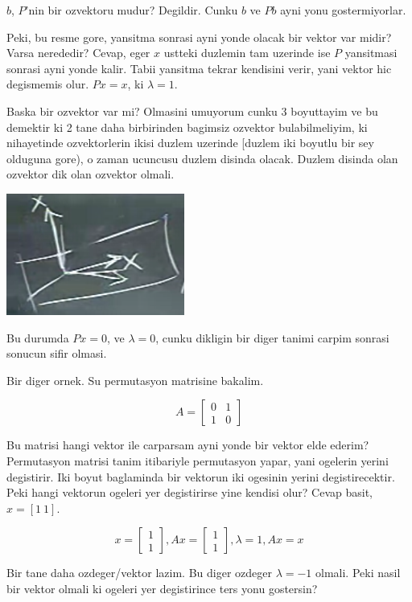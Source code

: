 \documentclass[12pt,fleqn]{article}\usepackage{../common}
\begin{document}
$b$, $P$'nin bir ozvektoru mudur? Degildir. Cunku $b$ ve $Pb$ ayni yonu
gostermiyorlar. 

Peki, bu resme gore, yansitma sonrasi ayni yonde olacak bir vektor var
midir? Varsa nerededir? Cevap, eger $x$ ustteki duzlemin tam uzerinde ise
$P$ yansitmasi sonrasi ayni yonde kalir. Tabii yansitma tekrar kendisini
verir, yani vektor hic degismemis olur. $Px = x$, ki $\lambda = 1$.

Baska bir ozvektor var mi? Olmasini umuyorum cunku 3 boyuttayim ve bu
demektir ki 2 tane daha birbirinden bagimsiz ozvektor bulabilmeliyim, ki
nihayetinde ozvektorlerin ikisi duzlem uzerinde [duzlem iki boyutlu bir sey
olduguna gore), o zaman ucuncusu duzlem disinda olacak. Duzlem disinda olan
ozvektor dik olan ozvektor olmali.

\includegraphics[height=4cm]{21_2.png}

Bu durumda $Px = 0$, ve $\lambda = 0$, cunku dikligin bir diger tanimi
carpim sonrasi sonucun sifir olmasi. 

Bir diger ornek. Su permutasyon matrisine bakalim. 

$$ 
A = \left[\begin{array}{cc}
0 & 1 \\
1 & 0
\end{array}\right]
 $$

 Bu matrisi hangi vektor ile carparsam ayni yonde bir vektor elde ederim?
 Permutasyon matrisi tanim itibariyle permutasyon yapar, yani ogelerin
 yerini degistirir. Iki boyut baglaminda bir vektorun iki ogesinin yerini
 degistirecektir. Peki hangi vektorun ogeleri yer degistirirse yine kendisi
 olur? Cevap basit, $x = [1 \ 1]$. 

$$ 
x = \left[\begin{array}{c}
1 \\ 1
\end{array}\right], 
Ax = \left[\begin{array}{c}
1 \\ 1
\end{array}\right], 
\lambda = 1, Ax = x
 $$

Bir tane daha ozdeger/vektor lazim. Bu diger ozdeger $\lambda = -1$
olmali. Peki nasil bir vektor olmali ki ogeleri yer degistirince ters yonu
gostersin? 
\end{document}
